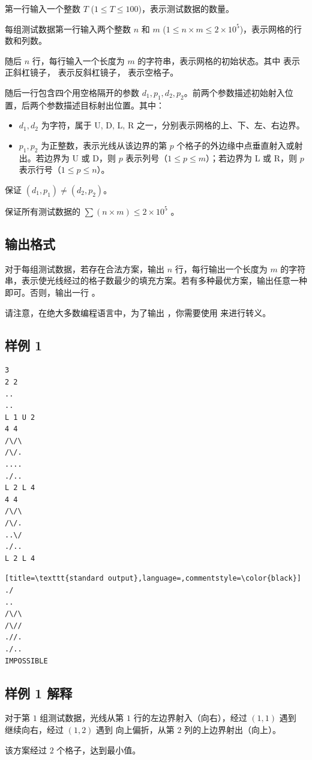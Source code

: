 第一行输入一个整数 $T$ ($1 \le T \le 100$)，表示测试数据的数量。

每组测试数据第一行输入两个整数 $n$ 和 $m$ ($1 \le n \times m \le 2 \times 10^5$)，表示网格的行数和列数。

随后 $n$ 行，每行输入一个长度为 $m$ 的字符串，表示网格的初始状态。其中 \TT{/} 表示正斜杠镜子，\TT{\textbackslash} 表示反斜杠镜子， 表示空格子。

随后一行包含四个用空格隔开的参数 $d_1, p_1, d_2, p_2$。前两个参数描述初始射入位置，后两个参数描述目标射出位置。其中：

\begin{itemize}
	\item $d_1,d_2$ 为字符，属于 U, D, L, R 之一，分别表示网格的上、下、左、右边界。
	\item $p_1,p_2$ 为正整数，表示光线从该边界的第 $p$ 个格子的外边缘中点垂直射入或射出。若边界为 U 或 D，则 $p$ 表示列号（$1 \le p \le m$）；若边界为 L 或 R，则 $p$ 表示行号（$1 \le p \le n$）。
\end{itemize}

保证 $(d_1,p_1) \ne (d_2,p_2)$。

保证所有测试数据的 $\sum (n \times m) \le 2 \times 10^5$ 。

\subsection{输出格式}

对于每组测试数据，若存在合法方案，输出 $n$ 行，每行输出一个长度为 $m$ 的字符串，表示使光线经过的格子数最少的填充方案。若有多种最优方案，输出任意一种即可。否则，输出一行 。

请注意，在绝大多数编程语言中，为了输出 \TT{\textbackslash} ，你需要使用 \TT{\textbackslash\textbackslash} 来进行转义。

\subsection{样例 1}

\begin{minipage}{\linewidth}
	\begin{minipage}[t]{0.49\linewidth}
		\begin{lstlisting}[title=\texttt{standard input}]
3
2 2
..
..
L 1 U 2
4 4
/\/\
/\/.
....
./..
L 2 L 4
4 4
/\/\
/\/.
..\/
./..
L 2 L 4
\end{lstlisting}
	\end{minipage}
	\begin{minipage}[t]{0.49\linewidth}
		\begin{lstlisting}[title=\texttt{standard output},language=,commentstyle=\color{black}]
./
..
/\/\
/\//
.//.
./..
IMPOSSIBLE
\end{lstlisting}
	\end{minipage}
\end{minipage}


\subsection{样例 1 解释}

对于第 $1$ 组测试数据，光线从第 $1$ 行的左边界射入（向右），经过 $(1, 1)$ 遇到  继续向右，经过 $(1, 2)$ 遇到 \TT{/} 向上偏折，从第 $2$ 列的上边界射出（向上）。

该方案经过 $2$ 个格子，达到最小值。
